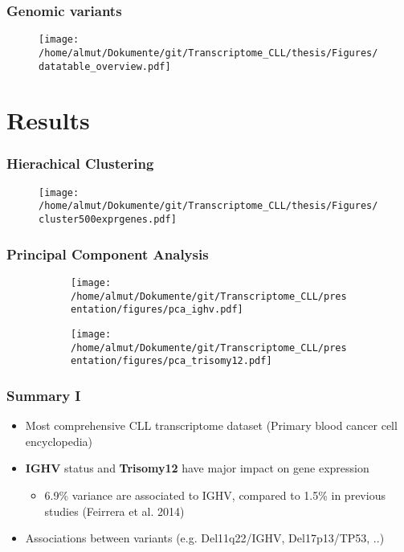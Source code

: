 \documentclass[xcolor=dvipsnames,t,10pt]{beamer}
\begin{document}
%
%
%
\begin{frame}[c]
	\frametitle{Genomic variants}
	\begin{figure}
		\centering
		\texttt{[image: /home/almut/Dokumente/git/Transcriptome\_CLL/thesis/Figures/datatable\_overview.pdf]}
	\end{figure}
\end{frame}
%
%
%
\section{Results}
%
%
\begin{frame}[c]
	\frametitle{Hierachical Clustering}
	\begin{figure}
		\centering
		\texttt{[image: /home/almut/Dokumente/git/Transcriptome\_CLL/thesis/Figures/cluster500exprgenes.pdf]}
	\end{figure}
\end{frame}
%
%
\begin{frame}[c]
	\frametitle{Principal Component Analysis}
	\begin{figure}
		\centering
		\begin{subfigure}[t]{0.45\columnwidth}
		\texttt{[image: /home/almut/Dokumente/git/Transcriptome\_CLL/presentation/figures/pca\_ighv.pdf]}
		\end{subfigure}
		\hfill
		\begin{subfigure}[t]{0.45\columnwidth}
		\texttt{[image: /home/almut/Dokumente/git/Transcriptome\_CLL/presentation/figures/pca\_trisomy12.pdf]}
		\end{subfigure}
	\end{figure}
\end{frame}
% 
%
\begin{frame}[c]
	\frametitle{Summary I}	
	\begin{itemize}
		\item Most comprehensive CLL transcriptome dataset (Primary blood cancer cell encyclopedia)
		\item \textbf{IGHV} status and \textbf{Trisomy12} have major impact on gene expression
		\begin{itemize}
			\item 6.9\% variance are associated to IGHV, compared to 1.5\% in previous studies (Feirrera et al. 2014)
		\end{itemize}
		\item Associations between variants (e.g. Del11q22/IGHV, Del17p13/TP53, ..)
	\end{itemize}
\end{frame}
%
%
\end{document}

